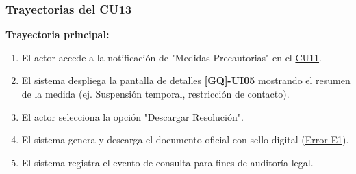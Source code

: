 \begin{appendices}
\subsubsection{Trayectorias del CU13}
\textbf{Trayectoria principal:}
\begin{enumerate}[nosep]
    \item El actor accede a la notificación de "Medidas Precautorias" en el \hyperlink{anexo:casos_uso}{CU11}.
    \item El sistema despliega la pantalla de detalles \textbf{[GQ]-UI05} mostrando el resumen de la medida (ej. Suspensión temporal, restricción de contacto).
    \item El actor selecciona la opción "Descargar Resolución".
    \item El sistema genera y descarga el documento oficial con sello digital (\hyperlink{err:E18}{Error E1}).
    \item El sistema registra el evento de consulta para fines de auditoría legal.
\end{enumerate}


\end{appendices}
